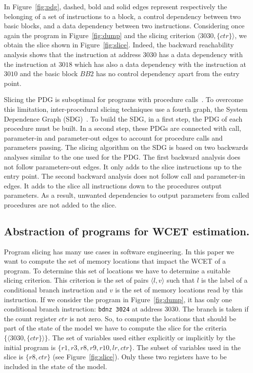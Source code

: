   In Figure~\ref{fig:pdg}, dashed, bold and solid edges represent respectively
  the belonging of a set of instructions to a block, a control dependency
  between two basic blocks, and a data dependency between two instructions.
  Considering once again the program in Figure~\ref{fig:dump} and the slicing
  criterion $\langle 3030, \{ctr\} \rangle$, we obtain the slice shown in
  Figure~\ref{fig:slice}. Indeed, the backward reachability analysis shows that
  the instruction at address $3030$ has a data dependency with the instruction
  at $3018$ which has also a data dependency with the instruction at $3010$ and
  the basic block $BB2$ has no control dependency apart from the entry point.

  Slicing the PDG is suboptimal for programs with procedure calls~\cite{KJL03}.
  To overcome this limitation, inter-procedural slicing techniques use a
  fourth graph, the System Dependence Graph (SDG)~\cite{HSR90}. To build the
  SDG, in a first step, the PDG of each procedure must be built. In a second
  step, these PDGs are connected with call, parameter-in and parameter-out edges
  to account for procedure calls and parameters passing. The slicing algorithm
  on the SDG is based on two backwards analyses similar to the one used for the
  PDG. The first backward analysis does not follow parameters-out edges. It only
  adds to the slice instructions up to the entry point. The second backward
  analysis does not follow call and parameter-in edges. It adds to the slice all
  instructions down to the procedures output parameters. As a result, unwanted
  dependencies to output parameters from called procedures are not added to the
  slice.

  \subsection{Abstraction of programs for WCET estimation.}
  \label{subsec:slicing-reduction}
  
  Program slicing has many use cases in software engineering.
  In this paper we
  want to compute the set of memory locations that impact the WCET of a
  program. 
  To determine this set of locations we have to determine a suitable
  slicing criterion. This criterion is the set of pairs $\langle l,v\rangle$
  such that $l$ is the label of a conditional branch instruction and $v$ is the
  set of memory locations read by this instruction. If we consider the program
  in Figure~\ref{fig:dump}, it has only one conditional branch instruction:
  \verb|bdnz 3024| at address $3030$. The branch is taken if the count register
  $ctr$ is not zero. So, to compute the locations that should be part of the
  state of the model we have to compute the slice for the criteria $\{\langle
  3030, \{ctr\} \rangle\}$. The set of variables used either explicitly or
  implicitly by the initial program is $\{r1, r3, r8, r9, r10, lr, ctr\}$. The
  subset of variables used in the slice is $\{r8, ctr\}$ (see
  Figure~\ref{fig:slice}). Only these two registers have to be included in the
  state of the model.

